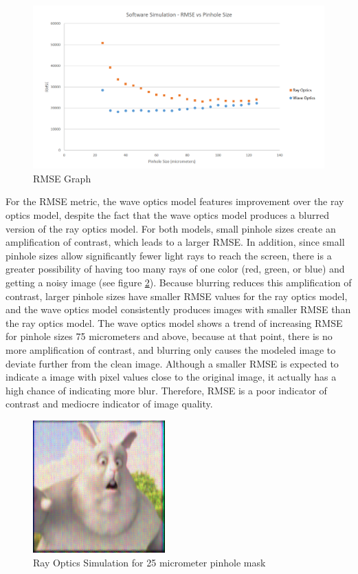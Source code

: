 \begin{figure}[ht]
  \centering
  \includegraphics[width=7.0in]{chapters/chapter8/images/RMSE.png}
  \caption{RMSE Graph}
  \label{fig:ferrari}
\end{figure}

For the RMSE metric, the wave optics model features improvement over the ray optics model, despite the fact that the wave optics model produces a blurred version of the ray optics model. For both models, small pinhole sizes create an amplification of contrast, which leads to a larger RMSE. In addition, since small pinhole sizes allow significantly fewer light rays to reach the screen, there is a greater possibility of having too many rays of one color (red, green, or blue) and getting a noisy image (see figure \ref{fig:25_micron}). Because blurring reduces this amplification of contrast, larger pinhole sizes have smaller RMSE values for the ray optics model, and the wave optics model consistently produces images with smaller RMSE than the ray optics model. The wave optics model shows a trend of increasing RMSE for pinhole sizes 75 micrometers and above, because at that point, there is no more amplification of contrast, and blurring only causes the modeled image to deviate further from the clean image. Although a smaller RMSE is expected to indicate a image with pixel values close to the original image, it actually has a high chance of indicating more blur. Therefore, RMSE is a poor indicator of contrast and mediocre indicator of image quality. 

\begin{figure}[h!]
  \centering
  \includegraphics[width=2in]{chapters/chapter8/images/simulationResult_25.png}
  \caption{Ray Optics Simulation for 25 micrometer pinhole mask}
  \label{fig:25_micron}
\end{figure}

